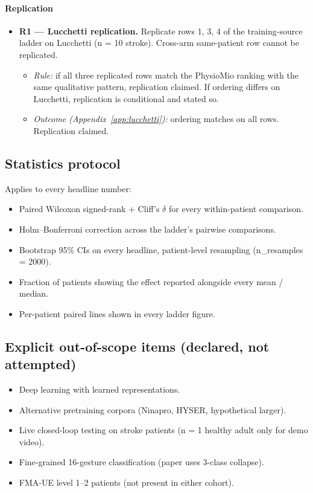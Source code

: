 \documentclass{article}
\begin{document}
\paragraph{Replication}

\begin{itemize}
  \item \textbf{R1 --- Lucchetti replication.} Replicate rows 1, 3, 4 of the training-source ladder on Lucchetti (n = 10 stroke). Cross-arm same-patient row cannot be replicated.
  \begin{itemize}
    \item \emph{Rule:} if all three replicated rows match the PhysioMio ranking with the same qualitative pattern, replication claimed. If ordering differs on Lucchetti, replication is conditional and stated so.
    \item \emph{Outcome (Appendix~\ref{app:lucchetti}):} ordering matches on all rows. Replication claimed.
  \end{itemize}
\end{itemize}

\subsection{Statistics protocol}

Applies to every headline number:

\begin{itemize}
  \item Paired Wilcoxon signed-rank + Cliff's $\delta$ for every within-patient comparison.
  \item Holm--Bonferroni correction across the ladder's pairwise comparisons.
  \item Bootstrap 95\% CIs on every headline, patient-level resampling (n\_resamples = 2000).
  \item Fraction of patients showing the effect reported alongside every mean / median.
  \item Per-patient paired lines shown in every ladder figure.
\end{itemize}

\subsection{Explicit out-of-scope items (declared, not attempted)}

\begin{itemize}
  \item Deep learning with learned representations.
  \item Alternative pretraining corpora (Ninapro, HYSER, hypothetical larger).
  \item Live closed-loop testing on stroke patients (n = 1 healthy adult only for demo video).
  \item Fine-grained 16-gesture classification (paper uses 3-class collapse).
  \item FMA-UE level 1--2 patients (not present in either cohort).
\end{itemize}
\end{document}
